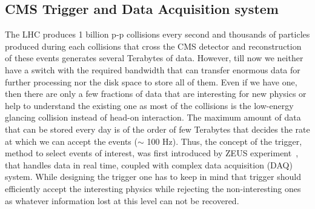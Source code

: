 \subsection{CMS Trigger and Data Acquisition system} %
\label{sub:cms_trigger_and_data_acquisition_system}
The LHC produces 1 billion p-p collisions every second and thousands of particles produced during each collisions that cross the CMS detector and reconstruction of these events generates several Terabytes of data. However, till now we neither have a switch with the required bandwidth that can transfer enormous data for further processing nor the disk space to store all of them. Even if we have one, then there are only a few fractions of data that are interesting for new physics or help to understand the existing one as most of the collisions is the low-energy glancing collision instead of head-on interaction. The maximum amount of data that can be stored every day is of the order of few Terabytes that decides the rate at which we can accept the events ($\sim$ 100 Hz). Thus, the concept of the trigger, method to select events of interest, was first introduced by ZEUS experiment~\cite{ZEUSCollaboration1993}, that handles data in real time, coupled with complex data acquisition (DAQ) system. While designing the trigger one has to keep in mind that trigger should efficiently accept the interesting physics while rejecting the non-interesting ones as whatever information lost at this level can not be recovered.


